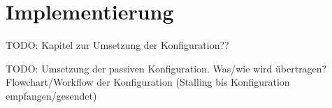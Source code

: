 \chapter{Implementierung}
TODO: Kapitel zur Umsetzung der Konfiguration??

TODO: Umsetzung der passiven Konfiguration. Was/wie wird übertragen? Flowchart/Workflow der Konfiguration (Stalling bis Konfiguration empfangen/gesendet)